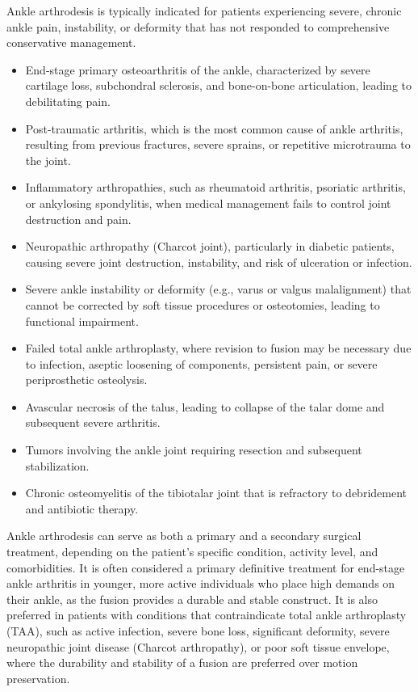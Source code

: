 Ankle arthrodesis is typically indicated for patients experiencing severe, chronic ankle pain, instability, or deformity that has not responded to comprehensive conservative management.

\begin{itemize}
  \item End-stage primary osteoarthritis of the ankle, characterized by severe cartilage loss, subchondral sclerosis, and bone-on-bone articulation, leading to debilitating pain.
  \item Post-traumatic arthritis, which is the most common cause of ankle arthritis, resulting from previous fractures, severe sprains, or repetitive microtrauma to the joint.
  \item Inflammatory arthropathies, such as rheumatoid arthritis, psoriatic arthritis, or ankylosing spondylitis, when medical management fails to control joint destruction and pain.
  \item Neuropathic arthropathy (Charcot joint), particularly in diabetic patients, causing severe joint destruction, instability, and risk of ulceration or infection.
  \item Severe ankle instability or deformity (e.g., varus or valgus malalignment) that cannot be corrected by soft tissue procedures or osteotomies, leading to functional impairment.
  \item Failed total ankle arthroplasty, where revision to fusion may be necessary due to infection, aseptic loosening of components, persistent pain, or severe periprosthetic osteolysis.
  \item Avascular necrosis of the talus, leading to collapse of the talar dome and subsequent severe arthritis.
  \item Tumors involving the ankle joint requiring resection and subsequent stabilization.
  \item Chronic osteomyelitis of the tibiotalar joint that is refractory to debridement and antibiotic therapy.
\end{itemize}

Ankle arthrodesis can serve as both a primary and a secondary surgical treatment, depending on the patient's specific condition, activity level, and comorbidities. It is often considered a primary definitive treatment for end-stage ankle arthritis in younger, more active individuals who place high demands on their ankle, as the fusion provides a durable and stable construct. It is also preferred in patients with conditions that contraindicate total ankle arthroplasty (TAA), such as active infection, severe bone loss, significant deformity, severe neuropathic joint disease (Charcot arthropathy), or poor soft tissue envelope, where the durability and stability of a fusion are preferred over motion preservation.

